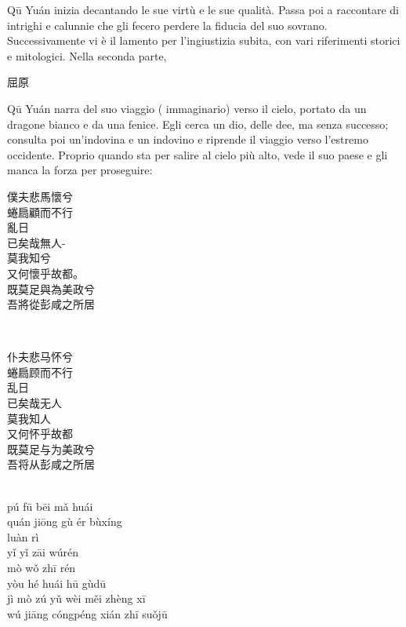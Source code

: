\documentclass[12pt,titlepage]{article}
\begin{document}
Qū Yuán inizia decantando le sue virtù e le sue qualità. Passa poi a raccontare di intrighi e calunnie che gli fecero perdere la fiducia del suo sovrano. Successivamente vi è il lamento per l'ingiustizia subita, con vari riferimenti storici e mitologici. Nella seconda parte,
 \begin{CJK*}{UTF8}{gbsn}屈原\end{CJK*}
  Qū Yuán narra del suo viaggio ( immaginario) verso il cielo, portato da un dragone bianco e da una fenice. Egli cerca un dio, delle dee, ma senza successo; consulta poi un'indovina e un indovino e riprende il viaggio verso l'estremo occidente. Proprio quando sta per salire al cielo più alto, vede il suo paese e gli manca la forza per proseguire:
\begin{multicols}{3}
 \begin{CJK*}{UTF8}{gbsn}
 \hspace{-1.5em}僕夫悲馬懷兮\\
 蜷扃顧而不行\\
 亂日\\
 已矣哉無人-\\
 莫我知兮\\
 又何懷乎故都。\\
 既莫足與為美政兮 \\
吾將從彭咸之所居\footnotemark
\\
\end{CJK*}
\columnbreak
\\
 \begin{CJK*}{UTF8}{gbsn}
\hspace{-1.5em}仆夫悲马怀兮\\
 蜷扃顾而不行\\
 乱日\\
已矣哉无人\\
莫我知人\\
 又何怀乎故都\\
既莫足与为美政兮 \\
吾将从彭咸之所居\\
\end{CJK*}
\columnbreak
\\
\hspace{-1.5em}pú fū bēi mǎ huái \\
quán jiōng gù ér bùxíng\\
luàn rì	\\
yǐ yǐ zāi wúrén	\\
mò wǒ zhī rén	\\
yòu hé huái hū gùdū\\
jì mò zú yǔ wèi měi zhèng xī\\
wú jiāng cóngpéng xián zhī suǒjū\\
\columnbreak
\end{multicols}
\end{document}
